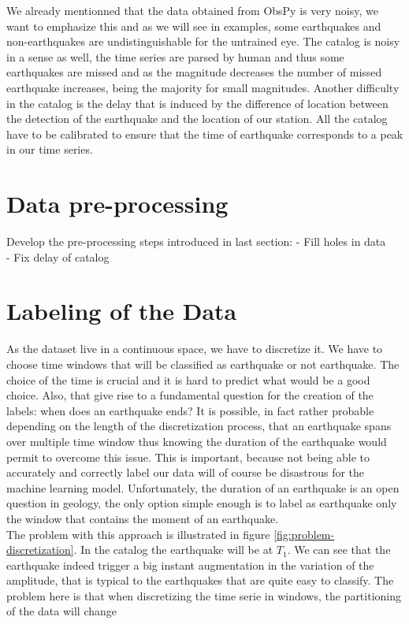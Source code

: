 \documentclass[10pt,conference,compsocconf]{IEEEtran}
\begin{document}
We already mentionned that the data obtained from ObsPy is very noisy, we want to emphasize this and as we will see in examples, some earthquakes and non-earthquakes are undistinguishable for the untrained eye. The catalog is noisy in a sense as well, the time series are parsed by human and thus some earthquakes are missed and as the magnitude decreases the number of missed earthquake increases, being the majority for small magnitudes. Another difficulty in the catalog is the delay that is induced by the difference of location between the detection of the earthquake and the location of our station. All the catalog have to be calibrated to ensure that the time of earthquake corresponds to a peak in our time series.

\section{Data pre-processing}
Develop the pre-processing steps introduced in last section:
- Fill holes in data\\
- Fix delay of catalog\\

\section{Labeling of the Data}
As the dataset live in a continuous space, we have to discretize it. We have to choose time windows that will be classified as earthquake or not earthquake. The choice of the time is crucial and it is hard to predict what would be a good choice. Also, that give rise to a fundamental question for the creation of the labels: when does an earthquake ends? It is possible, in fact rather probable depending on the length of the discretization process, that an earthquake spans over multiple time window thus knowing the duration of the earthquake would permit to overcome this issue. This is important, because not being able to accurately and correctly label our data will of course be disastrous for the machine learning model. Unfortunately, the duration of an earthquake is an open question in geology, the only option simple enough is to label as earthquake only the window that contains the moment of an earthquake.\\
The problem with this approach is illustrated in figure \ref{fig:problem-discretization}. In the catalog the earthquake will be at $T_1$. We can see that the earthquake indeed trigger a big instant augmentation in the variation of the amplitude, that is typical to the earthquakes that are quite easy to classify. The problem here is that when discretizing the time serie in windows, the partitioning of the data will change
\end{document}
